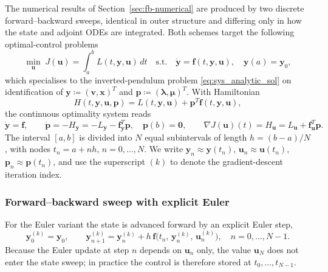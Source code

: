 \documentclass[a4paper, 10pt]{article}
\begin{document}
The numerical results of Section~\ref{sec:fb-numerical} are produced
by two discrete forward--backward sweeps, identical in outer structure
and differing only in how the state and adjoint ODEs are integrated.
Both schemes target the following optimal-control problems
\begin{equation}
    \min_{\bm{u}}\; J(\bm{u}) = \int_{a}^{b} L(t,\bm{y},\bm{u})\,dt
    \quad \text{s.t.} \quad \dot{\bm{y}} = \bm{f}(t,\bm{y},\bm{u}),
    \quad \bm{y}(a) = \bm{y}_0,
\end{equation}
which specialises to the inverted-pendulum problem
\eqref{eq:sys_analytic_sol} on identification of $\bm{y} \coloneqq
(\bm{v},\bm{x})^{T}$ and $\bm{p} \coloneqq (\bm{\lambda},\bm{\mu})^{T}$.
With Hamiltonian
\begin{equation}
    H(t,\bm{y},\bm{u},\bm{p}) = L(t,\bm{y},\bm{u}) + \bm{p}^{T}\bm{f}(t,\bm{y},\bm{u}),
\end{equation}
the continuous optimality system reads
\begin{equation}
    \dot{\bm{y}} = \bm{f},
    \qquad
    \dot{\bm{p}} = -H_{\bm{y}} = -L_{\bm{y}} - \bm{f}_{\bm{y}}^{T}\bm{p},
    \quad \bm{p}(b) = \bm{0},
    \qquad
    \nabla J(\bm{u})(t) = H_{\bm{u}} = L_{\bm{u}} + \bm{f}_{\bm{u}}^{T}\bm{p}.
    \label{eq:fb-cont-opt}
\end{equation}
The interval $[a,b]$ is divided into $N$ equal subintervals of length
$h = (b-a)/N$, with nodes $t_n = a + n h$, $n = 0,\dots,N$. We write
$\bm{y}_n \approx \bm{y}(t_n)$, $\bm{u}_n \approx \bm{u}(t_n)$,
$\bm{p}_n \approx \bm{p}(t_n)$, and use the superscript $(k)$ to denote
the gradient-descent iteration index.

\subsubsection{Forward--backward sweep with explicit Euler}
\label{sec:fb-euler}

For the Euler variant the state is advanced forward by an explicit Euler
step,
\begin{equation}
    \bm{y}_0^{(k)} = \bm{y}_0, \qquad
    \bm{y}_{n+1}^{(k)} = \bm{y}_n^{(k)} + h\,\bm{f}\!\bigl(t_n,\, \bm{y}_n^{(k)},\, \bm{u}_n^{(k)}\bigr),
    \quad n = 0,\dots,N-1.
    \label{eq:fb-eul-state}
\end{equation}
Because the Euler update at step $n$ depends on $\bm{u}_n$ only, the value
$\bm{u}_N$ does not enter the state sweep; in practice the control is
therefore stored at $t_0,\dots,t_{N-1}$.
\end{document}
